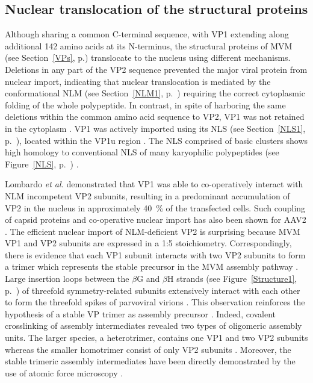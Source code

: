 \subsection{Nuclear translocation of the structural proteins}
\label{Struc Transloc}
Although sharing a common C-terminal sequence, with VP1 extending along additional 142 amino acids at its N-terminus, the structural proteins of MVM (see Section~\ref{VPs}, p.\pageref{VPs}) translocate to the nucleus using different mechanisms. Deletions in any part of the VP2 sequence prevented the major viral protein from nuclear import, indicating that nuclear translocation is mediated by the conformational NLM (see Section~\ref{NLM1}, p.~\pageref{NLM1}) requiring the correct cytoplasmic folding of the whole polypeptide. In contrast, in spite of harboring the same deletions within the common amino acid sequence to VP2, VP1 was not retained in the cytoplasm \cite{pmid10729155}. VP1 was actively imported using its NLS (see Section~\ref{NLS1}, p.~\pageref{NLS1}), located within the VP1u region \cite{pmid12072505}. The NLS comprised of basic clusters shows high homology to conventional NLS of many karyophilic polypeptides (see Figure~\ref{NLS}, p.~\pageref{NLS}) \cite{pmid2004116, pmid6088992}. 

Lombardo \textit{et al.} demonstrated that VP1 was able to co-operatively interact with NLM incompetent VP2 subunits, resulting in a predominant accumulation of VP2 in the nucleus in approximately 40~\% of the transfected cells. Such coupling of capsid proteins and co-operative nuclear import has also been shown for AAV2 \cite{pmid1331503}. The efficient nuclear import of NLM-deficient VP2 is surprising because MVM VP1 and VP2 subunits are expressed in a 1:5 stoichiometry. Correspondingly, there is evidence that each VP1 subunit interacts with two VP2 subunits to form a trimer which represents the stable precursor in the MVM assembly pathway \cite{pmid10729155}. Large insertion loops between the $\beta$G and $\beta$H strands (see Figure~\ref{Structure1}, p.~\pageref{Structure1}) of threefold symmetry-related subunits extensively interact with each other \cite{pmid8377200, pmid8969301} to form the threefold spikes of parvoviral virions \cite{pmid9817841, pmid2006420}. This observation reinforces the hypothesis of a stable VP trimer as assembly precursor \cite{pmid10729155}. Indeed, covalent crosslinking of assembly intermediates revealed two types of oligomeric assembly units. The larger species, a heterotrimer, contains one VP1 and two VP2 subunits whereas the smaller homotrimer consist of only VP2 subunits \cite{pmid16469332}. Moreover, the stable trimeric assembly intermediates have been directly demonstrated by the use of atomic force microscopy \cite{pmid22713577}.     

